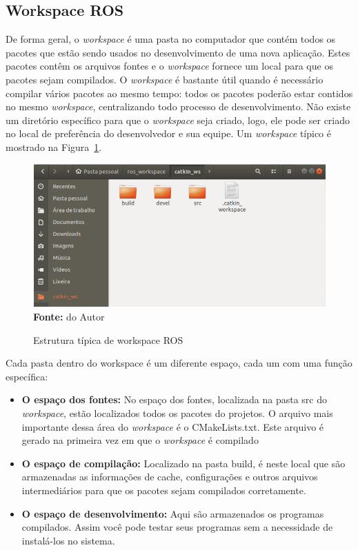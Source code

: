 \subsection{Workspace ROS}
De forma geral, o \textit{workspace} é uma pasta no computador que contém todos os pacotes que estão sendo usados no desenvolvimento de uma nova aplicação. Estes pacotes contêm os arquivos fontes e o \textit{workspace} fornece um local para que os pacotes sejam compilados. O \textit{workspace} é bastante útil quando é necessário compilar vários pacotes ao mesmo tempo: todos os pacotes poderão estar contidos no mesmo \textit{workspace}, centralizando todo processo de desenvolvimento. Não existe um diretório específico para que o \textit{workspace} seja criado, logo, ele pode ser criado no local de preferência do desenvolvedor e sua equipe. Um \textit{workspace} típico é mostrado na Figura~\ref{fig:rosworkspace}. 

\begin{figure}[ht]
	\caption{Estrutura típica de workspace ROS}
	\begin{center}
		\includegraphics[scale=0.43]{imagens/rosworkspace.png}\\
		{\small \textbf{Fonte:} do Autor}
    \end{center}\label{fig:rosworkspace}
\end{figure}

Cada pasta dentro do workspace é um diferente espaço, cada um com uma função específica:

\begin{itemize}
    \item \textbf{O espaço dos fontes:} No espaço dos fontes, localizada na pasta src do \textit{workspace}, estão localizados todos os pacotes do projetos. O arquivo mais importante dessa área do \textit{workspace} é o CMakeLists.txt. Este arquivo é gerado na primeira vez em que o \textit{workspace} é compilado

    \item \textbf{O espaço de compilação:} Localizado na pasta build, é neste local que são armazenadas as informações de cache, configurações e outros arquivos intermediários para que os pacotes sejam compilados corretamente.

    \item \textbf{O espaço de desenvolvimento:} Aqui são armazenados os programas compilados. Assim você pode testar seus programas sem a necessidade de instalá-los no sistema.
\end{itemize}

